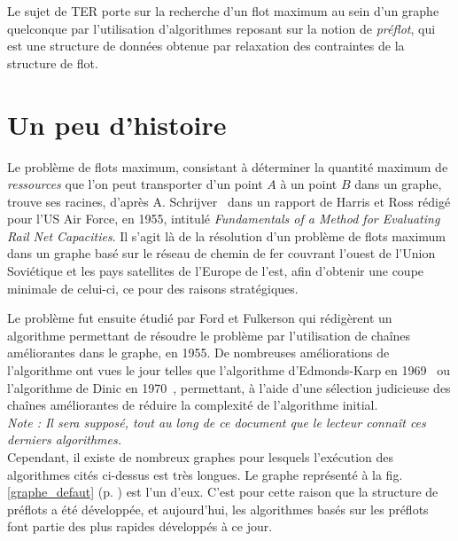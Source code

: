 
Le sujet de TER porte sur la recherche d'un flot maximum au sein d'un graphe quelconque par
l'utilisation d'algorithmes reposant sur la notion de \emph{préflot}, qui est une structure de
données obtenue par relaxation des contraintes de la structure de flot. \\

\section{Un peu d'histoire}

Le problème de flots maximum, consistant à déterminer la quantité maximum de \emph{ressources} que
l'on peut transporter d'un point $A$ à un point $B$ dans un graphe, trouve ses racines, d'après A. 
Schrijver~\cite{schrij02} dans un rapport de Harris et Ross rédigé pour l'US
Air Force, en 1955, intitulé \emph{Fundamentals of a Method for Evaluating Rail Net Capacities}.  Il
s'agit là de la résolution d'un problème de flots maximum dans un graphe basé sur le réseau de
chemin de fer couvrant l'ouest de l'Union Soviétique et les pays satellites de l'Europe de l'est,
afin d'obtenir une coupe minimale de celui-ci, ce pour des raisons stratégiques.

Le problème fut ensuite étudié par Ford et Fulkerson qui rédigèrent un algorithme permettant de
résoudre le problème par l'utilisation de chaînes améliorantes dans le graphe, en 1955. De
nombreuses améliorations de l'algorithme ont vues le jour telles que l'algorithme d'Edmonds-Karp en
1969~\cite{gold88} ou l'algorithme de Dinic en 1970~\cite{gold88}, permettant, à l'aide d'une sélection 
judicieuse des chaînes améliorantes de réduire la complexité de l'algorithme initial.\\

\emph{Note : Il sera supposé, tout au long de ce document que le lecteur connaît ces derniers
algorithmes.} \\


Cependant, il existe de nombreux graphes pour lesquels l'exécution des algorithmes cités
ci-dessus est très longues. Le graphe représenté à la fig. \ref{graphe_defaut} (p.
\pageref{graphe_defaut}) est l'un d'eux. C'est pour cette raison que la structure de préflots a été
développée, et aujourd'hui, les algorithmes basés sur les préflots font partie des plus rapides
développés à ce jour.\\

